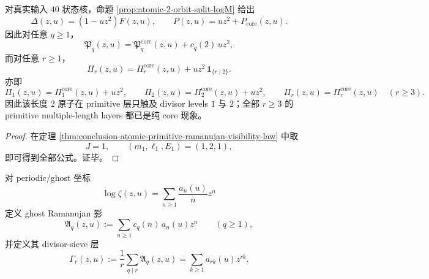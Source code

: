 \begin{corollary}\label{cor:conclusion-realinput40-primitive-ramanujan-first-two-layers}
对真实输入 \(40\) 状态核，命题 \ref{prop:atomic-2-orbit-split-logM} 给出
\[
\Delta(z,u)=(1-uz^2)F(z,u),
\qquad
P(z,u)=uz^2+P_{\mathrm{core}}(z,u).
\]
因此对任意 \(q\ge 1\)，
\[
\mathfrak P_q(z,u)
=
\mathfrak P_q^{\mathrm{core}}(z,u)+c_q(2)\,uz^2,
\]
而对任意 \(r\ge 1\)，
\[
\Pi_r(z,u)
=
\Pi_r^{\mathrm{core}}(z,u)+uz^2\,\mathbf 1_{\{r\mid 2\}}.
\]
亦即
\[
\Pi_1(z,u)=\Pi_1^{\mathrm{core}}(z,u)+uz^2,
\qquad
\Pi_2(z,u)=\Pi_2^{\mathrm{core}}(z,u)+uz^2,
\qquad
\Pi_r(z,u)=\Pi_r^{\mathrm{core}}(z,u)\quad (r\ge 3).
\]
因此该长度 \(2\) 原子在 primitive 层只触及 divisor levels \(1\) 与 \(2\)；全部 \(r\ge 3\) 的 primitive multiple-length layers 都已是纯 core 现象。
\end{corollary}
\begin{proof}
在定理 \ref{thm:conclusion-atomic-primitive-ramanujan-visibility-law} 中取
\[
J=1,
\qquad
(m_1,\ell_1,E_1)=(1,2,1),
\]
即可得到全部公式。证毕。
\end{proof}

对 periodic/ghost 坐标
\[
\log\zeta(z,u)=\sum_{n\ge 1}\frac{a_n(u)}{n}z^n
\]
定义 ghost Ramanujan 影
\[
\mathfrak A_q(z,u):=\sum_{n\ge 1}c_q(n)\,a_n(u)z^n
\qquad (q\ge 1),
\]
并定义其 divisor-sieve 层
\[
\Gamma_r(z,u):=\frac1r\sum_{q\mid r}\mathfrak A_q(z,u)
=
\sum_{k\ge 1}a_{rk}(u)z^{rk}.
\]

